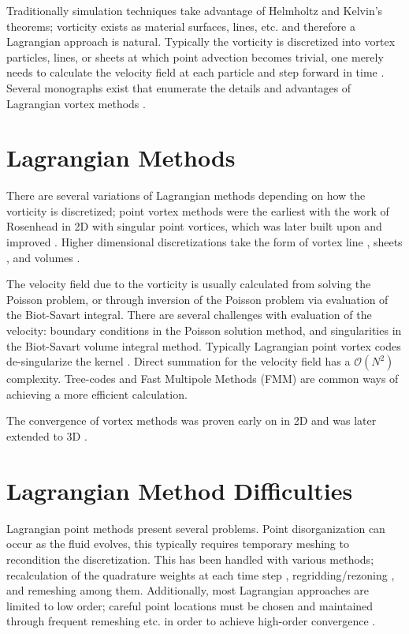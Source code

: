 \documentclass[letterpaper,12pt]{report}
\begin{document}
Traditionally simulation techniques take advantage of Helmholtz and Kelvin's theorems; vorticity exists as material surfaces, lines, etc. and therefore a Lagrangian approach is natural. Typically the vorticity is discretized into vortex particles, lines, or sheets at which point advection becomes trivial, one merely needs to calculate the velocity field at each particle and step forward in time \cite{Strain1996,MoussaCarley2008,KoumLeonard1995}. Several monographs exist that enumerate the details and advantages of Lagrangian vortex methods \cite{Lugt1983,Saffman1992,Speziale1987}.

\section{Lagrangian Methods}
There are several variations of Lagrangian methods depending on how the vorticity is discretized; point vortex methods were the earliest with the work of Rosenhead \cite{Point1} in 2D with singular point vortices, which was later built upon and improved \cite{Point2,Point3,Point4,Point5,Point6}. Higher dimensional discretizations take the form of vortex line \cite{Line1,Line2,Line3,Line4}, sheets \cite{Sheet1,Sheet2,Sheet3}, and volumes \cite{Volumes1,Volumes2,Volumes3}.

The velocity field due to the vorticity is usually calculated from solving the Poisson problem, or through inversion of the Poisson problem via evaluation of the Biot-Savart integral. There are several challenges with evaluation of the velocity: boundary conditions in the Poisson solution method, and singularities in the Biot-Savart volume integral method. Typically Lagrangian point vortex codes de-singularize the kernel \cite{Rosenhead1930,Moore1972}. Direct summation for the velocity field has a $\mathcal{O}(N^2)$ complexity. Tree-codes \cite{LindsayKrasny2001} and Fast Multipole Methods (FMM) \cite{Strain1997} are common ways of achieving a more efficient calculation.

The convergence of vortex methods was proven early on in 2D \cite{Convg2D} and was later extended to 3D \cite{Convg3D}.

\section{Lagrangian Method Difficulties}
Lagrangian point methods present several problems. Point disorganization can occur as the fluid evolves, this typically requires temporary meshing to recondition the discretization. This has been handled with various methods; recalculation of the quadrature weights at each time step \cite{Remesh2,Remesh3}, regridding/rezoning \cite{Remesh4}, and remeshing \cite{Remesh5} among them. Additionally, most Lagrangian approaches are limited to low order; careful point locations must be chosen and maintained through frequent remeshing etc. in order to achieve high-order convergence \cite{Strain1997}.
\end{document}
